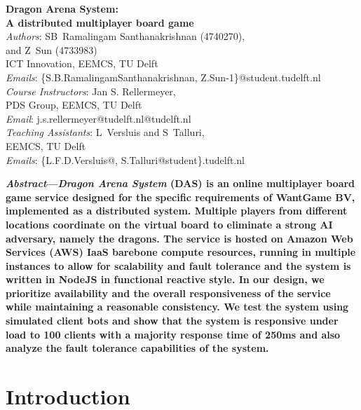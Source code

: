 \documentclass[a4paper]{IEEEtran}
\begin{document}
  
  \setlength{\tabcolsep}{10pt}
  \renewcommand{\arraystretch}{1.25}

  \begin{center}
    \textbf{\Large{
      Dragon Arena System: \\ A distributed multiplayer board game
    }}\\
    \vspace{0.25cm}
    \emph{Authors}: SB~Ramalingam Santhanakrishnan (4740270), \\ and Z~Sun (4733983) \\
    ICT Innovation, EEMCS, TU Delft\\
    \emph{Emails}: \{S.B.RamalingamSanthanakrishnan, Z.Sun-1\}@student.tudelft.nl\\
    \vspace{0.2cm}
    \emph{Course Instructors}: Jan S. Rellermeyer,\\
    PDS Group, EEMCS, TU Delft\\
    \emph{Email}: j.s.rellermeyer@tudelft.nl@tudelft.nl\\
    \vspace{0.2cm}
    \emph{Teaching Assistants}: L~Versluis and S~Talluri,\\
    EEMCS, TU Delft\\
    \emph{Emails}: {\{L.F.D.Versluis@, S.Talluri@student\}.tudelft.nl}\\
  \end{center}
  
  \vspace{0.2cm}
  
  \textbf{
    \emph{Abstract}---\emph{Dragon Arena System} (DAS) is an online multiplayer board game service designed for the specific requirements of WantGame BV, implemented as a distributed system. Multiple players from different locations coordinate on the virtual board to eliminate a strong AI adversary, namely the dragons. The service is hosted on Amazon Web Services (AWS) IaaS barebone compute resources, running in multiple instances to allow for scalability and fault tolerance and the system is written in NodeJS in functional reactive style. In our design, we prioritize availability and the overall responsiveness of the service while maintaining a reasonable consistency. We test the system using simulated client bots and show that the system is responsive under load to 100 clients with a majority response time of 250ms and also analyze the fault tolerance capabilities of the system. 
  }
  
  \section{Introduction}
  
\end{document}
